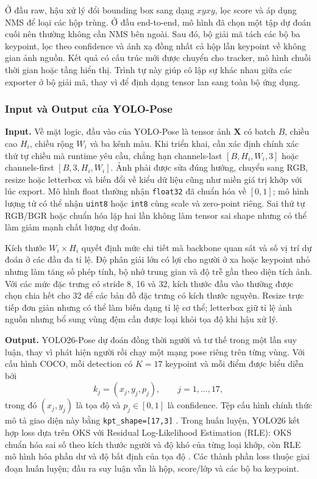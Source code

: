 Ở đầu raw, hậu xử lý đổi bounding box sang dạng $xyxy$, lọc score và áp dụng NMS để loại các hộp trùng. Ở đầu end-to-end, mô hình đã chọn một tập dự đoán cuối nên thường không cần NMS bên ngoài. Sau đó, bộ giải mã tách các bộ ba keypoint, lọc theo confidence và ánh xạ đồng nhất cả hộp lẫn keypoint về không gian ảnh nguồn. Kết quả có cấu trúc mới được chuyển cho tracker, mô hình chuỗi thời gian hoặc tầng hiển thị. Trình tự này giúp cô lập sự khác nhau giữa các exporter ở bộ giải mã, thay vì để định dạng tensor lan sang toàn bộ ứng dụng.

\subsubsection{Input và Output của YOLO-Pose}
\label{sec:yolo_pose_output_representation}

\textbf{Input.} Về mặt logic, đầu vào của YOLO-Pose là tensor ảnh $\mathbf{X}$ có batch $B$, chiều cao $H_i$, chiều rộng $W_i$ và ba kênh màu. Khi triển khai, cần xác định chính xác thứ tự chiều mà runtime yêu cầu, chẳng hạn channels-last $[B,H_i,W_i,3]$ hoặc channels-first $[B,3,H_i,W_i]$. Ảnh phải được sửa đúng hướng, chuyển sang RGB, resize hoặc letterbox và biến đổi về kiểu dữ liệu cũng như miền giá trị khớp với lúc export. Mô hình float thường nhận \texttt{float32} đã chuẩn hóa về $[0,1]$; mô hình lượng tử có thể nhận \texttt{uint8} hoặc \texttt{int8} cùng scale và zero-point riêng. Sai thứ tự RGB/BGR hoặc chuẩn hóa lặp hai lần không làm tensor sai shape nhưng có thể làm giảm mạnh chất lượng dự đoán.

Kích thước $W_i\times H_i$ quyết định mức chi tiết mà backbone quan sát và số vị trí dự đoán ở các đầu đa tỉ lệ. Độ phân giải lớn có lợi cho người ở xa hoặc keypoint nhỏ nhưng làm tăng số phép tính, bộ nhớ trung gian và độ trễ gần theo diện tích ảnh. Với các mức đặc trưng có stride 8, 16 và 32, kích thước đầu vào thường được chọn chia hết cho 32 để các bản đồ đặc trưng có kích thước nguyên. Resize trực tiếp đơn giản nhưng có thể làm biến dạng tỉ lệ cơ thể; letterbox giữ tỉ lệ ảnh nguồn nhưng bổ sung vùng đệm cần được loại khỏi tọa độ khi hậu xử lý.

\textbf{Output.} YOLO26-Pose dự đoán đồng thời người và tư thế trong một lần suy luận, thay vì phát hiện người rồi chạy một mạng pose riêng trên từng vùng. Với cấu hình COCO, mỗi detection có $K=17$ keypoint và mỗi điểm được biểu diễn bởi
\begin{equation}
k_j=(x_j,y_j,p_j),\qquad j=1,\ldots,17,
\end{equation}
trong đó $(x_j,y_j)$ là tọa độ và $p_j\in[0,1]$ là confidence. Tệp cấu hình chính thức mô tả giao diện này bằng \texttt{kpt\_shape=[17,3]} . Trong huấn luyện, YOLO26 kết hợp loss dựa trên OKS với Residual Log-Likelihood Estimation (RLE): OKS chuẩn hóa sai số theo kích thước người và độ khó của từng loại khớp, còn RLE mô hình hóa phần dư và độ bất định của tọa độ . Các thành phần loss thuộc giai đoạn huấn luyện; đầu ra suy luận vẫn là hộp, score/lớp và các bộ ba keypoint.

